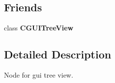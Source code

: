 \subsection*{Friends}
\begin{DoxyCompactItemize}
\item 
\hypertarget{classirr_1_1gui_1_1_c_g_u_i_tree_view_node_a2e75a0ae1429a3b07fee6280dfb00985}{class {\bfseries C\-G\-U\-I\-Tree\-View}}\label{classirr_1_1gui_1_1_c_g_u_i_tree_view_node_a2e75a0ae1429a3b07fee6280dfb00985}

\end{DoxyCompactItemize}


\subsection{Detailed Description}
Node for gui tree view. 

